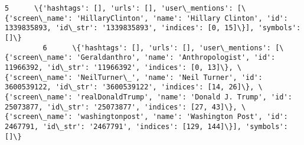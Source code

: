 \documentclass[11pt]{article}
\begin{document}
\begin{Verbatim}[commandchars=\\\{\}]
         5      \{'hashtags': [], 'urls': [], 'user\_mentions': [\{'screen\_name': 'HillaryClinton', 'name': 'Hillary Clinton', 'id': 1339835893, 'id\_str': '1339835893', 'indices': [0, 15]\}], 'symbols': []\}                                                                                                                                                                                                                                                                                                                                                                                                                                                                                                                                                                                                                                                                                                                                                                                                                                                                                                                                                                                                                     
         6      \{'hashtags': [], 'urls': [], 'user\_mentions': [\{'screen\_name': 'Geraldanthro', 'name': 'Anthropologist', 'id': 11966392, 'id\_str': '11966392', 'indices': [0, 13]\}, \{'screen\_name': 'NeilTurner\_', 'name': 'Neil Turner', 'id': 3600539122, 'id\_str': '3600539122', 'indices': [14, 26]\}, \{'screen\_name': 'realDonaldTrump', 'name': 'Donald J. Trump', 'id': 25073877, 'id\_str': '25073877', 'indices': [27, 43]\}, \{'screen\_name': 'washingtonpost', 'name': 'Washington Post', 'id': 2467791, 'id\_str': '2467791', 'indices': [129, 144]\}], 'symbols': []\}                                                                                                                                                                                                                                                                                                                                                                                                                                                                                                                                                                                                                                                   

\end{Verbatim}
\end{document}
